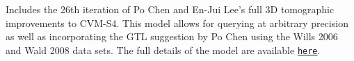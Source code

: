Includes the 26th iteration of Po Chen and En-\/\+Jui Lee's full 3\+D tomographic improvements to C\+V\+M-\/\+S4. This model allows for querying at arbitrary precision as well as incorporating the G\+T\+L suggestion by Po Chen using the Wills 2006 and Wald 2008 data sets. The full details of the model are available \href{http://scec.usc.edu/scecpedia/CVM-S5}{\tt here}. 